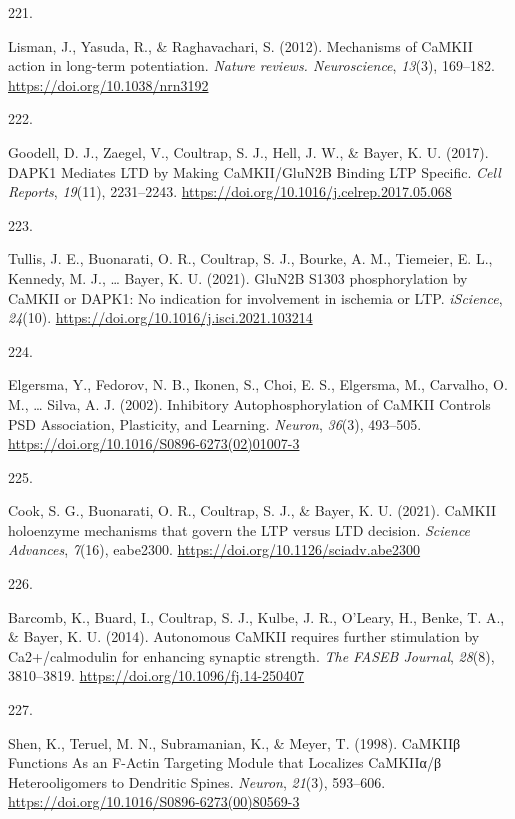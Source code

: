 \documentclass[
  11pt,
  letterpaper,
]{scrreprt}
\newlength{\cslhangindent}
\newlength{\csllabelwidth}
\newenvironment{CSLReferences}[2] %
 {\begin{list}{}{%
  \setlength{\itemindent}{0pt}
  \setlength{\leftmargin}{0pt}
  \setlength{\parsep}{0pt}
  \ifodd #1
   \setlength{\leftmargin}{\cslhangindent}
   \setlength{\itemindent}{-1\cslhangindent}
  \fi
  \setlength{\itemsep}{#2\baselineskip}}}
 {\end{list}}
\newcommand{\CSLLeftMargin}[1]{\parbox[t]{\csllabelwidth}{\strut#1\strut}}
\newcommand{\CSLRightInline}[1]{\parbox[t]{\linewidth - \csllabelwidth}{\strut#1\strut}}
\begin{document}
\begin{CSLReferences}{0}{0}
\CSLLeftMargin{221. }%
\CSLRightInline{Lisman, J., Yasuda, R., \& Raghavachari, S. (2012).
Mechanisms of {CaMKII} action in long-term potentiation. \emph{Nature
reviews. Neuroscience}, \emph{13}(3), 169--182.
\url{https://doi.org/10.1038/nrn3192}}

\CSLLeftMargin{222. }%
\CSLRightInline{Goodell, D. J., Zaegel, V., Coultrap, S. J., Hell, J.
W., \& Bayer, K. U. (2017). {DAPK1 Mediates LTD} by {Making
CaMKII}/{GluN2B Binding LTP Specific}. \emph{Cell Reports},
\emph{19}(11), 2231--2243.
\url{https://doi.org/10.1016/j.celrep.2017.05.068}}

\CSLLeftMargin{223. }%
\CSLRightInline{Tullis, J. E., Buonarati, O. R., Coultrap, S. J.,
Bourke, A. M., Tiemeier, E. L., Kennedy, M. J., \ldots{} Bayer, K. U.
(2021). {GluN2B S1303} phosphorylation by {CaMKII} or {DAPK1}: {No}
indication for involvement in ischemia or {LTP}. \emph{iScience},
\emph{24}(10). \url{https://doi.org/10.1016/j.isci.2021.103214}}

\CSLLeftMargin{224. }%
\CSLRightInline{Elgersma, Y., Fedorov, N. B., Ikonen, S., Choi, E. S.,
Elgersma, M., Carvalho, O. M., \ldots{} Silva, A. J. (2002). Inhibitory
{Autophosphorylation} of {CaMKII Controls PSD Association},
{Plasticity}, and {Learning}. \emph{Neuron}, \emph{36}(3), 493--505.
\url{https://doi.org/10.1016/S0896-6273(02)01007-3}}

\CSLLeftMargin{225. }%
\CSLRightInline{Cook, S. G., Buonarati, O. R., Coultrap, S. J., \&
Bayer, K. U. (2021). {CaMKII} holoenzyme mechanisms that govern the
{LTP} versus {LTD} decision. \emph{Science Advances}, \emph{7}(16),
eabe2300. \url{https://doi.org/10.1126/sciadv.abe2300}}

\CSLLeftMargin{226. }%
\CSLRightInline{Barcomb, K., Buard, I., Coultrap, S. J., Kulbe, J. R.,
O'Leary, H., Benke, T. A., \& Bayer, K. U. (2014). Autonomous {CaMKII}
requires further stimulation by {Ca2}+/calmodulin for enhancing synaptic
strength. \emph{The FASEB Journal}, \emph{28}(8), 3810--3819.
\url{https://doi.org/10.1096/fj.14-250407}}

\CSLLeftMargin{227. }%
\CSLRightInline{Shen, K., Teruel, M. N., Subramanian, K., \& Meyer, T.
(1998). {CaMKIIβ Functions As} an {F-Actin Targeting Module} that
{Localizes CaMKIIα}/β {Heterooligomers} to {Dendritic Spines}.
\emph{Neuron}, \emph{21}(3), 593--606.
\url{https://doi.org/10.1016/S0896-6273(00)80569-3}}


\end{CSLReferences}
\end{document}
